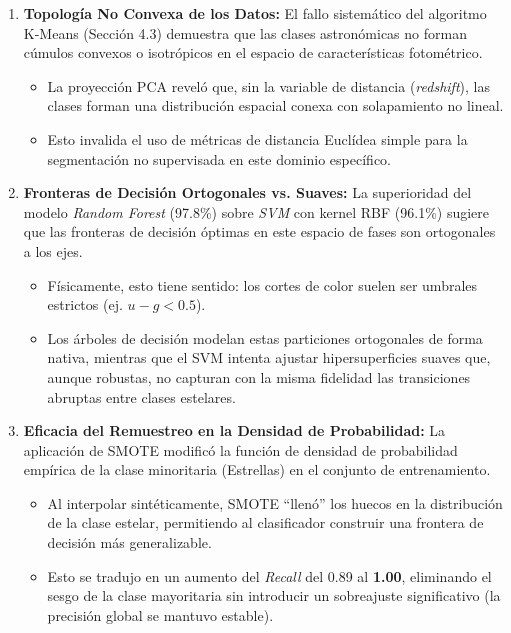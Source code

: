 \documentclass[12pt, a4paper]{report}
\begin{document}
\begin{enumerate}
    \item \textbf{Topología No Convexa de los Datos:} El fallo sistemático del algoritmo K-Means (Sección 4.3) demuestra que las clases astronómicas no forman cúmulos convexos o isotrópicos en el espacio de características fotométrico.
    \begin{itemize}
        \item La proyección PCA reveló que, sin la variable de distancia (\textit{redshift}), las clases forman una distribución espacial conexa con solapamiento no lineal.
        \item Esto invalida el uso de métricas de distancia Euclídea simple para la segmentación no supervisada en este dominio específico.
    \end{itemize}

    \item \textbf{Fronteras de Decisión Ortogonales vs. Suaves:} La superioridad del modelo \textit{Random Forest} (97.8\%) sobre \textit{SVM} con kernel RBF (96.1\%) sugiere que las fronteras de decisión óptimas en este espacio de fases son ortogonales a los ejes.
    \begin{itemize}
        \item Físicamente, esto tiene sentido: los cortes de color suelen ser umbrales estrictos (ej. $u-g < 0.5$).
        \item Los árboles de decisión modelan estas particiones ortogonales de forma nativa, mientras que el SVM intenta ajustar hipersuperficies suaves que, aunque robustas, no capturan con la misma fidelidad las transiciones abruptas entre clases estelares.
    \end{itemize}

    \item \textbf{Eficacia del Remuestreo en la Densidad de Probabilidad:} La aplicación de SMOTE modificó la función de densidad de probabilidad empírica de la clase minoritaria (Estrellas) en el conjunto de entrenamiento.
    \begin{itemize}
        \item Al interpolar sintéticamente, SMOTE ``llenó'' los huecos en la distribución de la clase estelar, permitiendo al clasificador construir una frontera de decisión más generalizable.
        \item Esto se tradujo en un aumento del \textit{Recall} del 0.89 al \textbf{1.00}, eliminando el sesgo de la clase mayoritaria sin introducir un sobreajuste significativo (la precisión global se mantuvo estable).
    \end{itemize}
\end{enumerate}
\end{document}
